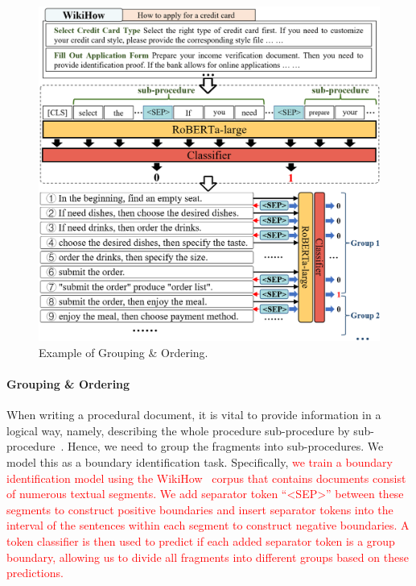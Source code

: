 

\begin{figure}[t]
    \centering
    \includegraphics[width=\linewidth]{figures/dataset/DatasetConstruction_2.png}
    \caption{Example of Grouping \& Ordering.
    }
    \label{fig:Grouping_Ordering}
\end{figure}

\paragraph{Grouping \& Ordering}
When writing a procedural document, it is vital to provide information in a logical way, namely, describing the whole procedure sub-procedure by sub-procedure~\cite{futrelle1999summarization, futrelle2004handling}. Hence, we need to group the fragments into sub-procedures. We model this as a boundary identification task. Specifically, 
\textcolor{red}{
we train a boundary identification model using the WikiHow~\cite{bolotova2023wikihowqa} corpus that contains documents consist of numerous textual segments. We add separator token ``<SEP>'' between these segments to construct positive boundaries and insert separator tokens into the interval of the sentences within each segment to construct negative boundaries. A token classifier is then used to predict if each added separator token is a group boundary, allowing us to divide all fragments into different groups based on these predictions. 
}

